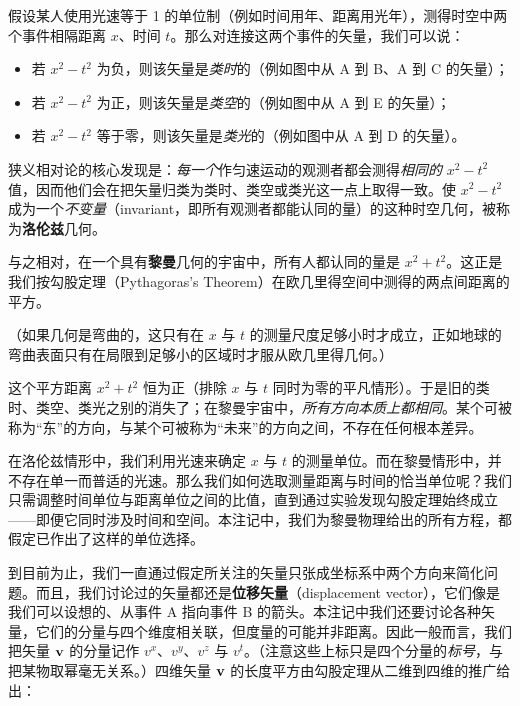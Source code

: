 假设某人使用光速等于 1 的单位制（例如时间用年、距离用光年），测得时空中两个事件相隔距离 $x$、时间 $t$。那么对连接这两个事件的矢量，我们可以说：

\begin{itemize}
  \item 若 $x^{2}-t^{2}$ 为负，则该矢量是\emph{类时}的（例如图中从 A 到 B、A 到 C 的矢量）；
  \item 若 $x^{2}-t^{2}$ 为正，则该矢量是\emph{类空}的（例如图中从 A 到 E 的矢量）；
  \item 若 $x^{2}-t^{2}$ 等于零，则该矢量是\emph{类光}的（例如图中从 A 到 D 的矢量）。
\end{itemize}

狭义相对论的核心发现是：\emph{每一个}作匀速运动的观测者都会测得\emph{相同的} $x^{2}-t^{2}$ 值，因而他们会在把矢量归类为类时、类空或类光这一点上取得一致。使 $x^{2}-t^{2}$ 成为一个\emph{不变量}（invariant，即所有观测者都能认同的量）的这种时空几何，被称为\textbf{洛伦兹}几何。


与之相对，在一个具有\textbf{黎曼}几何的宇宙中，所有人都认同的量是 $x^{2}+t^{2}$。这正是我们按勾股定理（Pythagoras's Theorem）在欧几里得空间中测得的两点间距离的平方。

（如果几何是弯曲的，这只有在 $x$ 与 $t$ 的测量尺度足够小时才成立，正如地球的弯曲表面只有在局限到足够小的区域时才服从欧几里得几何。）

这个平方距离 $x^{2}+t^{2}$ 恒为正（排除 $x$ 与 $t$ 同时为零的平凡情形）。于是旧的类时、类空、类光之别的消失了；在黎曼宇宙中，\emph{所有方向本质上都相同}。某个可被称为“东”的方向，与某个可被称为“未来”的方向之间，不存在任何根本差异。

在洛伦兹情形中，我们利用光速来确定 $x$ 与 $t$ 的测量单位。而在黎曼情形中，并不存在单一而普适的光速。那么我们如何选取测量距离与时间的恰当单位呢？我们只需调整时间单位与距离单位之间的比值，直到通过实验发现勾股定理始终成立——即便它同时涉及时间和空间。本注记中，我们为黎曼物理给出的所有方程，都假定已作出了这样的单位选择。

到目前为止，我们一直通过假定所关注的矢量只张成坐标系中两个方向来简化问题。而且，我们讨论过的矢量都还是\textbf{位移矢量}（displacement vector），它们像是我们可以设想的、从事件 A 指向事件 B 的箭头。本注记中我们还要讨论各种矢量，它们的分量与四个维度相关联，但度量的可能并非距离。因此一般而言，我们把矢量 $\mathbf{v}$ 的分量记作 $v^{x}$、$v^{y}$、$v^{z}$ 与 $v^{t}$。（注意这些上标只是四个分量的\emph{标号}，与把某物取幂毫无关系。）四维矢量 $\mathbf{v}$ 的长度平方由勾股定理从二维到四维的推广给出：

